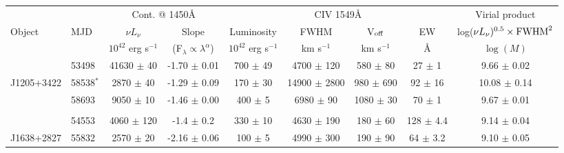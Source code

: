 \begin{table*}
  \small
  \begin{centering}
    \begin{tabular}{l  l | c c | c c c c | c}
      \hline
      \hline
                        &                     &  \multicolumn{2}{c}{Cont. @ 1450\AA }                                           &   \multicolumn{4}{c}{CIV 1549\AA}                                                                   &  Virial product \\
       Object      &   MJD             &       $\nu L_{\nu}$         &         Slope                                               &   Luminosity                &     FWHM                &    V$_{\rm off}$           &          EW          &  log($\nu L_{\nu})^{0.5} \times {\rm FWHM}^2$\\
                       &                     & $10^{42}$ erg s$^{-1}$ & (F$_\lambda \propto \lambda^\alpha$)    & $10^{42}$ erg s$^{-1}$ &     km s$^{-1}$      &    km s$^{-1}$             &          \AA         &  $\log(M)$ \\
      \hline
                       &  53498          &   41630   $\pm$   40    &  -1.70 $\pm$ 0.01                               &   700    $\pm$ 49       &  4700 $\pm$  120     &     580    $\pm$   80      &   27  $\pm$  1      &  9.66 $\pm$ 0.02\\
 J1205+3422  &  58538$^*$   &    2870    $\pm$   40     &  -1.29 $\pm$ 0.09                              &  170    $\pm$ 30      & 14900 $\pm$ 2800   &     980    $\pm$  690      &   92    $\pm$    16        & 10.08  $\pm$ 0.14 \\
                       &  58693          &    9050    $\pm$   10     &  -1.46 $\pm$ 0.00                              &  400   $\pm$   5       &  6980 $\pm$   90      &    1080    $\pm$   30      &   70 $\pm$  1  &  9.67 $\pm$ 0.01\\
                       &                      &                                      &                                                             &                                  &                                   &                                       &                                   &                  \\
                       &  54553         &    4060    $\pm$  120    &  -1.4  $\pm$ 0.2                                 & 330      $\pm$ 10      &  4630 $\pm$  190     &     180    $\pm$   60     &  128  $\pm$  4.4   &  9.14 $\pm$ 0.04\\
 J1638+2827   &  55832        &    2570    $\pm$   20      &  -2.16 $\pm$ 0.06                             & 100    $\pm$  5        &  4990 $\pm$  300      &     190    $\pm$   90      &   64  $\pm$  3.2   &  9.10 $\pm$ 0.05\\

\end{tabular}
\end{centering}
\end{table*}
